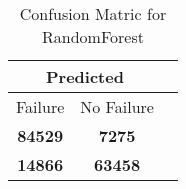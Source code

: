 \begin{table}[] 
\label{Table: Prediction Accuracy-DMDRandomForestOnlySunEKF-ignoreReflection-Reflection} 
\caption{Confusion Matric for RandomForest} 
\centering 
\begin{tabular} 
 {@{}ccc@{}} 
\toprule 
\multicolumn{2}{c}{\textbf{Predicted}}
 \\ \midrule 
\multicolumn{1}{|c|}{Failure} & 
\multicolumn{1}{c|}{No Failure}
 \\ \midrule 
\multicolumn{1}{|c|}{\color{green}\textbf{84529}} & 
\multicolumn{1}{c|}{\color{red}\textbf{7275}}
 \\ \midrule 
\multicolumn{1}{|c|}{\color{red}\textbf{14866}} & 
\multicolumn{1}{c|}{\color{green}\textbf{63458}}
 \\ \bottomrule 
\end{tabular} 
\end{table} 
